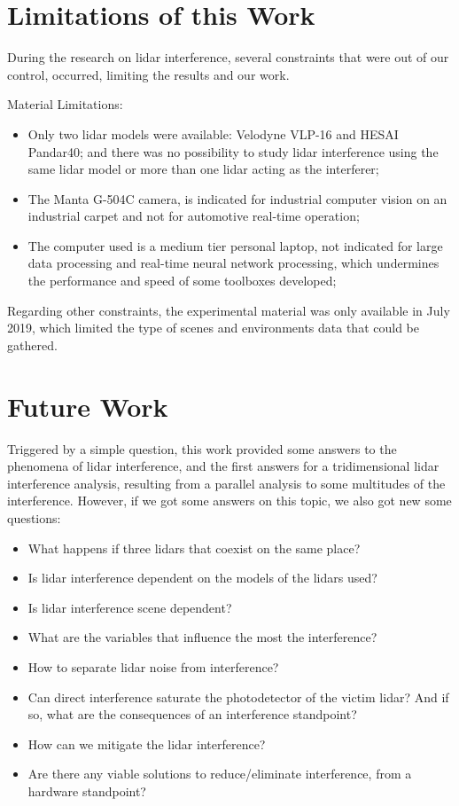 \section{Limitations of this Work}
\label{sec:conclusion:limitations-of-this-work}

During the research on \ac{lidar} interference, several constraints that were out of our control, occurred, limiting the results and our work. 

Material Limitations:
\begin{itemize}
	\item Only two \ac{lidar} models were available: Velodyne VLP-16 and HESAI Pandar40; and there was no possibility to study \ac{lidar} interference using the same \ac{lidar} model or more than one \ac{lidar} acting as the interferer;
	\item The Manta G-504C camera, is indicated for industrial computer vision on an industrial carpet and not for automotive real-time operation;
	\item The computer used is a medium tier personal laptop, not indicated for large data processing and real-time neural network processing, which undermines the performance and speed of some toolboxes developed;
\end{itemize}

Regarding other constraints, the experimental material was only available in July 2019, which  limited the type of scenes and environments data that could be gathered.


\section{Future Work}
\label{sec:conclusion:future-work}

Triggered by a simple question, this work provided some answers to the phenomena of \ac{lidar} interference, and the first answers for a tridimensional \ac{lidar} interference analysis, resulting from a parallel analysis to some multitudes of the interference. However, if we got some answers on this topic, we also got new some questions:

\begin{itemize}
	\item What happens if three \acp{lidar} that coexist on the same place?%
	\item Is \ac{lidar} interference dependent on the models of the \acp{lidar} used?
	\item Is \ac{lidar} interference scene dependent?
	\item What are the variables that influence the most the interference?
	\item How to separate \ac{lidar} noise from interference?
	\item Can direct interference saturate the photodetector of the victim \ac{lidar}? And if so, what are the consequences of an interference standpoint?
	\item How can we mitigate the \ac{lidar} interference?
	\item Are there any viable solutions to reduce/eliminate interference, from a hardware standpoint?
\end{itemize}

